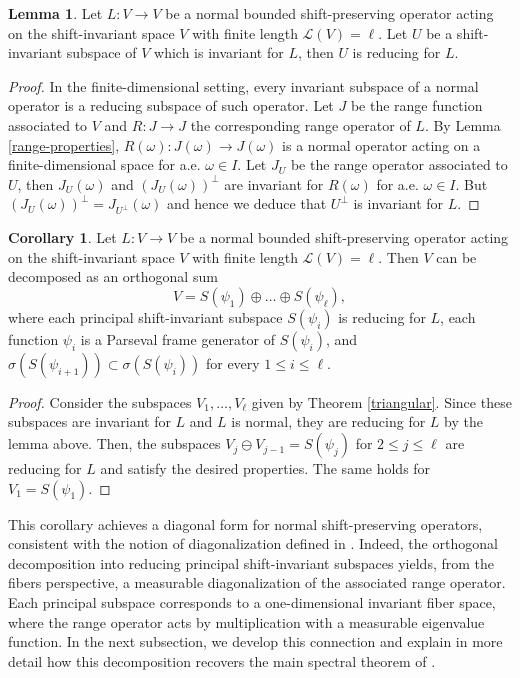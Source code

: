 \documentclass[a4paper,11pt]{amsart}
\theoremstyle{definition}
\newtheorem{lem}[fed]{Lemma}
\newtheorem{cor}[fed]{Corollary}
\theoremstyle{definition}
\def\bdem{\begin{proof}}
\def\edem{\end{proof}}
\def\w{\omega}
\def\ele{\mathcal{L}}
\begin{document}
\begin{lem}
	Let $L:V\to V$ be a normal bounded shift-preserving operator acting on the shift-invariant space $V$ with finite length $\ele(V)=\ell$. Let $U$ be a shift-invariant subspace of $V$ which is invariant for $L$, then $U$ is reducing for $L$.
\end{lem}

\begin{proof}
	In the finite-dimensional setting, every invariant subspace of a normal operator is a reducing subspace of such operator. Let $J$ be the range function associated to $V$ and $R:J\to J$ the corresponding range operator of $L$. By Lemma \ref{range-properties}, $R(\w):J(\w)\to J(\w)$ is a normal operator acting on a finite-dimensional space for a.e. $\w\in I$. Let $J_U$ be the range operator associated to $U$, then $J_U(\w)$ and $(J_U(\w))^\perp$ are invariant for $R(\w)$ for a.e. $\w\in  I$. But $(J_U(\w))^\perp = J_{U^\perp}(\w)$ and hence we deduce that $U^\perp$ is invariant for $L$.
\end{proof}


\begin{cor}\label{spectral-cor}
	Let $L :V\rightarrow V$ be a normal bounded shift-preserving operator acting on the shift-invariant space $V$ with finite length $\ele(V)=\ell$. Then $V$ can be decomposed as an orthogonal sum 
	\begin{equation*}
		V=S(\psi_1)\oplus \dots \oplus S(\psi_{\ell}),
	\end{equation*} where each principal shift-invariant subspace $S(\psi_i)$ is reducing for $L$, each function $\psi_i$ is a Parseval frame generator of $S(\psi_i)$, and $\sigma(S(\psi_{i+1}))\subset \sigma(S(\psi_i))$ for every $1 \leq i \leq \ell$.
\end{cor}
\bdem
Consider the subspaces $V_1,\dots,V_{\ell}$ given by Theorem \ref{triangular}. Since these subspaces are invariant for $L$ and $L$ is normal, they are reducing for $L$ by the lemma above. 
Then, the subspaces $V_{j}\ominus V_{j-1} = S(\psi_{j}) $ for $2\leq j\leq \ell$ are reducing for $L$ and satisfy the desired properties. The same holds for $V_1 = S(\psi_1)$. 
\edem

This corollary achieves a diagonal form for normal shift-preserving operators, consistent with the notion of diagonalization defined in \cite{ACCP}. Indeed, the orthogonal decomposition into reducing principal shift-invariant subspaces yields, from the fibers perspective, a measurable diagonalization of the associated range operator. Each principal subspace corresponds to a one-dimensional invariant fiber space, where the range operator acts by multiplication with a measurable eigenvalue function. In the next subsection, we develop this connection and explain in more detail how this decomposition recovers the main spectral theorem of \cite{ACCP}.
\end{document}
